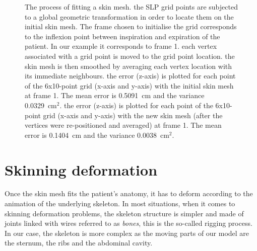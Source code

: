 \begin{figure}
{\label{fig:3_error_vertices_average_mse=01404}
}
   \caption[The process of fitting a skin mesh]{The process of fitting a skin mesh.
    the SLP grid points are subjected to a global geometric transformation in order to locate them on the initial skin mesh. The frame chosen to initialise the grid corresponds to the inflexion point between inspiration and expiration of the patient. In our example it corresponds to frame 1.
    each vertex associated with a grid point is moved to the grid point location.
    the skin mesh is then smoothed by averaging each vertex location with its immediate neighbours.
    the error (z-axis) is plotted for each point of the 6x10-point grid (x-axis and y-axis) with the initial skin mesh at frame 1. The mean error is 0.5091~cm and the variance 0.0329~cm$^2$.
    the error (z-axis) is plotted for each point of the 6x10-point grid (x-axis and y-axis) with the new skin mesh (after the vertices were re-positioned and averaged) at frame 1. The mean error is 0.1404~cm and the variance 0.0038~cm$^2$.}
   \label{fig:skin}
\end{figure}

\section{\label{sec:skin_deformation}Skinning deformation}
Once the skin mesh fits the patient's anatomy, it has to deform according to the animation of the underlying skeleton. In most situations, when it comes to skinning deformation problems, the skeleton structure is simpler and made of joints linked with wires referred to as \emph{bones}, this is the so-called rigging process. In our case, the skeleton is more complex as the moving parts of our model are the sternum, the ribs and the abdominal cavity.

